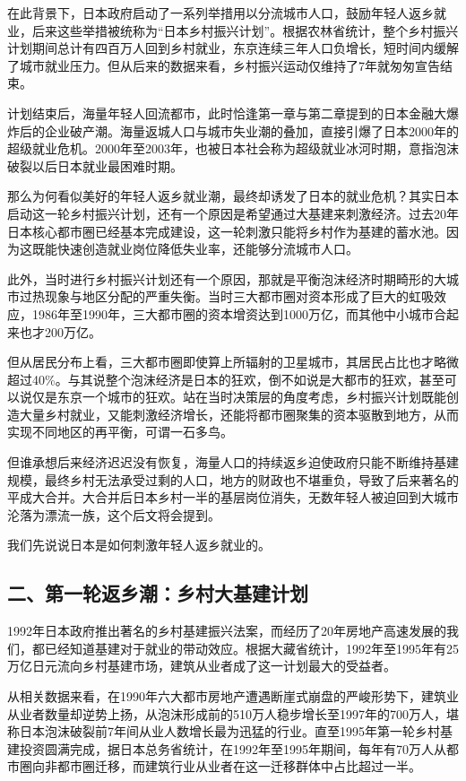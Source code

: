在此背景下，日本政府启动了一系列举措用以分流城市人口，鼓励年轻人返乡就业，后来这些举措被统称为“日本乡村振兴计划”。根据农林省统计，整个乡村振兴计划期间总计有四百万人回到乡村就业，东京连续三年人口负增长，短时间内缓解了城市就业压力。但从后来的数据来看，乡村振兴运动仅维持了7年就匆匆宣告结束。

计划结束后，海量年轻人回流都市，此时恰逢第一章与第二章提到的日本金融大爆炸后的企业破产潮。海量返城人口与城市失业潮的叠加，直接引爆了日本2000年的超级就业危机。2000年至2003年，也被日本社会称为超级就业冰河时期，意指泡沫破裂以后日本就业最困难时期。

那么为何看似美好的年轻人返乡就业潮，最终却诱发了日本的就业危机？其实日本启动这一轮乡村振兴计划，还有一个原因是希望通过大基建来刺激经济。过去20年日本核心都市圈已经基本完成建设，这一轮刺激只能将乡村作为基建的蓄水池。因为这既能快速创造就业岗位降低失业率，还能够分流城市人口。

此外，当时进行乡村振兴计划还有一个原因，那就是平衡泡沫经济时期畸形的大城市过热现象与地区分配的严重失衡。当时三大都市圈对资本形成了巨大的虹吸效应，1986年至1990年，三大都市圈的资本增资达到1000万亿，而其他中小城市合起来也才200万亿。

但从居民分布上看，三大都市圈即使算上所辐射的卫星城市，其居民占比也才略微超过40\%。与其说整个泡沫经济是日本的狂欢，倒不如说是大都市的狂欢，甚至可以说仅是东京一个城市的狂欢。站在当时决策层的角度考虑，乡村振兴计划既能创造大量乡村就业，又能刺激经济增长，还能将都市圈聚集的资本驱散到地方，从而实现不同地区的再平衡，可谓一石多鸟。

但谁承想后来经济迟迟没有恢复，海量人口的持续返乡迫使政府只能不断维持基建规模，最终乡村无法承受过剩的人口，地方的财政也不堪重负，导致了后来著名的平成大合并。大合并后日本乡村一半的基层岗位消失，无数年轻人被迫回到大城市沦落为漂流一族，这个后文将会提到。

我们先说说日本是如何刺激年轻人返乡就业的。

\subsection{二、第一轮返乡潮：乡村大基建计划}

1992年日本政府推出著名的乡村基建振兴法案，而经历了20年房地产高速发展的我们，都已经知道基建对于就业的带动效应。根据大藏省统计，1992年至1995年有25万亿日元流向乡村基建市场，建筑从业者成了这一计划最大的受益者。

从相关数据来看，在1990年六大都市房地产遭遇断崖式崩盘的严峻形势下，建筑业从业者数量却逆势上扬，从泡沫形成前的510万人稳步增长至1997年的700万人，堪称日本泡沫破裂前7年间从业人数增长最为迅猛的行业。直至1995年第一轮乡村基建投资圆满完成，据日本总务省统计，在1992年至1995年期间，每年有70万人从都市圈向非都市圈迁移，而建筑行业从业者在这一迁移群体中占比超过一半。


